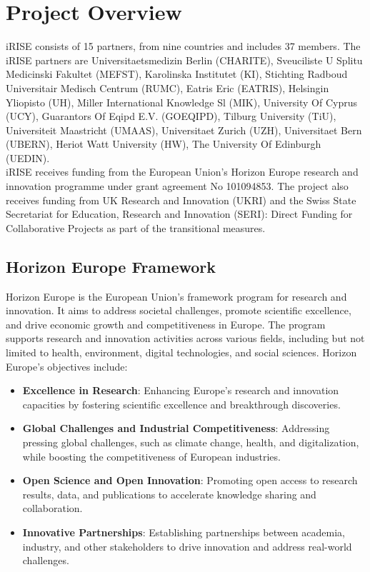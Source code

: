 \documentclass[
]{article}
\providecommand{\tightlist}{%
  \setlength{\itemsep}{0pt}\setlength{\parskip}{0pt}}
\begin{document}
\hypertarget{project-overview}{%
\section{\texorpdfstring{\textbf{Project Overview}}{Project Overview}}\label{project-overview}}

iRISE consists of 15 partners, from nine countries and includes 37 members. The iRISE partners are Universitaetsmedizin Berlin (CHARITE), Sveuciliste U Splitu Medicinski Fakultet (MEFST), Karolinska Institutet (KI), Stichting Radboud Universitair Medisch Centrum (RUMC), Eatris Eric (EATRIS), Helsingin Yliopisto (UH), Miller International Knowledge Sl (MIK), University Of Cyprus (UCY), Guarantors Of Eqipd E.V. (GOEQIPD), Tilburg University (TiU), Universiteit Maastricht (UMAAS), Universitaet Zurich (UZH), Universitaet Bern (UBERN), Heriot Watt University (HW), The University Of Edinburgh (UEDIN).\\
iRISE receives funding from the European Union's Horizon Europe research and innovation programme under grant agreement No 101094853. The project also receives funding from UK Research and Innovation (UKRI) and the Swiss State Secretariat for Education, Research and Innovation (SERI): Direct Funding for Collaborative Projects as part of the transitional measures.

\hypertarget{horizon-europe-framework}{%
\subsection{Horizon Europe Framework}\label{horizon-europe-framework}}

Horizon Europe is the European Union's framework program for research and innovation. It aims to address societal challenges, promote scientific excellence, and drive economic growth and competitiveness in Europe. The program supports research and innovation activities across various fields, including but not limited to health, environment, digital technologies, and social sciences. Horizon Europe's objectives include:

\begin{itemize}
\tightlist
\item
  \textbf{Excellence in Research}: Enhancing Europe's research and innovation capacities by fostering scientific excellence and breakthrough discoveries.
\item
  \textbf{Global Challenges and Industrial Competitiveness}: Addressing pressing global challenges, such as climate change, health, and digitalization, while boosting the competitiveness of European industries.
\item
  \textbf{Open Science and Open Innovation}: Promoting open access to research results, data, and publications to accelerate knowledge sharing and collaboration.
\item
  \textbf{Innovative Partnerships}: Establishing partnerships between academia, industry, and other stakeholders to drive innovation and address real-world challenges.
\end{itemize}
\end{document}
